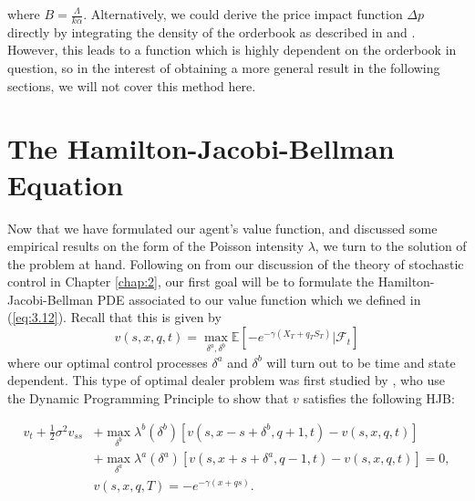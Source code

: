 where $B=\frac{\Lambda}{k\alpha}$.
Alternatively, we could derive the price impact function $\Delta p$ directly by 
integrating the density of the orderbook as described in \cite{Weber2005}
and \cite{Smith2003}. However, this leads to a function which is highly dependent
on the orderbook in question, so in the interest of obtaining a more general result
in the following sections, we will not cover this method here.

\newpage
\section{The Hamilton-Jacobi-Bellman Equation}\label{sec:3.7}

Now that we have formulated our agent's value function, and discussed 
some empirical results on the form of the Poisson intensity $\lambda$,
we turn to the solution of the problem at hand. Following on from our 
discussion of the theory of stochastic control in Chapter \ref{chap:2},
our first goal will be to formulate the Hamilton-Jacobi-Bellman PDE
associated to our value function which we defined in (\ref{eq:3.12}).
Recall that this is given by
\begin{equation}
    v(s,x,q,t)=\max\limits_{\delta^a,\delta^b}\mathbb{E}\left[-e^{-\gamma(X_T+q_TS_T)}|\mathcal{F}_t\right]
\end{equation}
where our optimal control processes $\delta^a$ and $\delta^b$ will
turn out to be time and state dependent. This type of optimal dealer 
problem was first studied by \cite{HS1981}, who use the Dynamic Programming 
Principle to show that $v$ satisfies the following HJB:
\begin{theorem}
    \begin{equation}\label{eq:3.17}
            \begin{aligned}
                v_t+\frac{1}{2}\sigma^2v_{ss}&+\max\limits_{\delta^b}\lambda^b(\delta^b)[v(s,x-s+\delta^b,q+1,t)-v(s,x,q,t)]\\
                &+\max\limits_{\delta^a}\lambda^a(\delta^a)[v(s,x+s+\delta^a,q-1,t)-v(s,x,q,t)]=0,\\
                &v(s,x,q,T)=-e^{-\gamma(x+qs)}.
            \end{aligned}
    \end{equation}
\end{theorem}
